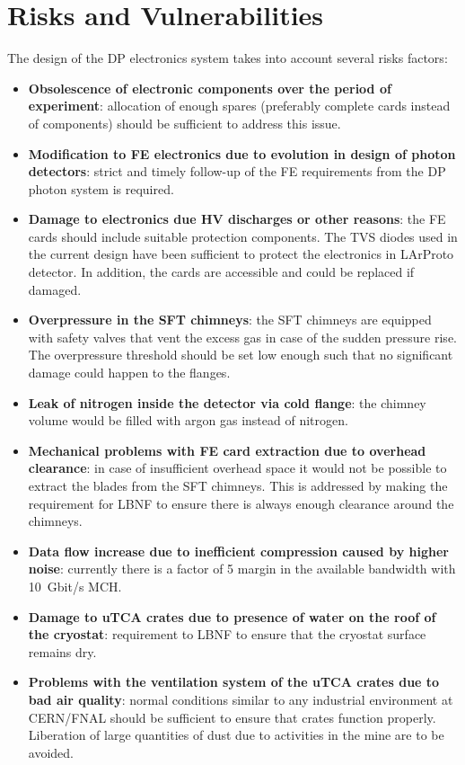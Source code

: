 \section{Risks and Vulnerabilities}
\label{sec:fddp-tpc-elec-risks}

The design of the DP electronics system takes into account several risks factors:
\begin{itemize}
\item{\textbf{Obsolescence of electronic components over the period of experiment}: allocation of enough spares (preferably complete cards instead of components) should be sufficient to address this issue. }
\item{\textbf{Modification to FE electronics due to evolution in design of photon detectors}: strict and timely follow-up of the FE requirements from the DP photon system is required.}
\item{\textbf{Damage to electronics due HV discharges or other reasons}: the FE cards should include suitable protection components. The TVS diodes used in the current design have been sufficient to protect the electronics in LArProto detector. In addition, the cards are accessible and could be replaced if damaged. }
\item{\textbf{Overpressure in the SFT chimneys}: the SFT chimneys are equipped with safety valves that vent the excess gas in case of the sudden pressure rise. The overpressure threshold should be set low enough such that no significant damage could happen to the flanges. }
\item{\textbf{Leak of nitrogen inside the detector via cold flange}: the chimney volume would be filled with argon gas instead of nitrogen.}
\item{\textbf{Mechanical problems with FE card extraction due to overhead clearance}: in case of insufficient overhead space it would not be possible to extract the blades from the SFT chimneys. This is addressed by making the requirement for LBNF to ensure there is always enough clearance around the chimneys.}
\item{\textbf{Data flow increase due to inefficient compression caused by higher noise}: currently there is a factor of \num{5} margin in the available bandwidth with \SI{10}{Gbit/s} MCH.}
\item{\textbf{Damage to uTCA crates due to presence of water on the roof of the cryostat}: requirement to LBNF to ensure that the cryostat surface remains dry.}
\item{\textbf{Problems with the ventilation system of the uTCA crates due to bad air quality}: normal conditions similar to any industrial environment at CERN/FNAL should be sufficient to ensure that crates function properly. Liberation of large quantities of dust due to activities in the mine are to be avoided.}
\end{itemize}
